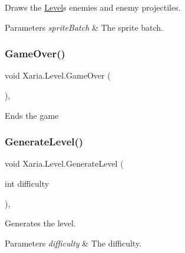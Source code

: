 Draws the \hyperlink{classXaria_1_1Level}{Level}\textquotesingle{}s enemies and enemy projectiles. 


\begin{DoxyParams}{Parameters}
{\em sprite\+Batch} & The sprite batch.\\
\hline
\end{DoxyParams}
\mbox{\label{classXaria_1_1Level_aca4ebca18f725704744d9c51073a44a5}} 
\subsubsection{\texorpdfstring{Game\+Over()}{GameOver()}}
{\footnotesize\ttfamily void Xaria.\+Level.\+Game\+Over (\begin{DoxyParamCaption}{ }\end{DoxyParamCaption})\hspace{0.3cm}{\ttfamily [inline]}, {\ttfamily [private]}}



Ends the game 

\mbox{\label{classXaria_1_1Level_a22bccc0212af3ebce89ad36a735cf2f1}} 
\subsubsection{\texorpdfstring{Generate\+Level()}{GenerateLevel()}}
{\footnotesize\ttfamily void Xaria.\+Level.\+Generate\+Level (\begin{DoxyParamCaption}\item[{int}]{difficulty }\end{DoxyParamCaption})\hspace{0.3cm}{\ttfamily [inline]}, {\ttfamily [private]}}



Generates the level. 


\begin{DoxyParams}{Parameters}
{\em difficulty} & The difficulty.\\
\hline
\end{DoxyParams}
\mbox{\label{classXaria_1_1Level_a501e6c0c3196d7cff51e14f57775a15e}} 
